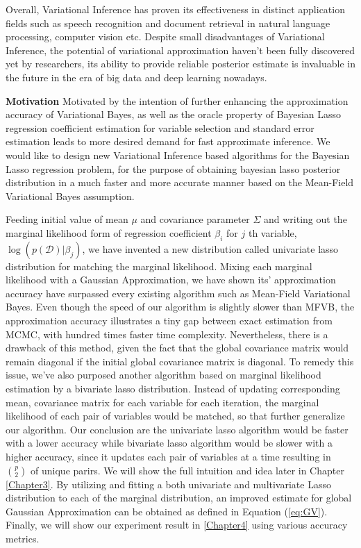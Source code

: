 Overall, Variational Inference has proven its effectiveness in distinct application fields such as speech recognition and document retrieval in natural language processing, computer vision etc. Despite small disadvantages of Variational Inference, the potential of variational approximation haven't been fully discovered yet by researchers, its ability to provide reliable posterior estimate is invaluable in the future in the era of big data and deep learning nowadays.

\textbf{Motivation}
Motivated by the intention of further enhancing the approximation accuracy of Variational Bayes, as well as the oracle property of Bayesian Lasso regression coefficient estimation for variable selection and standard error estimation leads to more desired demand for fast approximate inference. We would like to design new Variational Inference based algorithms for the Bayesian Lasso regression problem, for the purpose of obtaining bayesian lasso posterior distribution in a much faster and more accurate manner based on the Mean-Field Variational Bayes assumption.

Feeding initial value of mean $\mu$ and covariance parameter $\Sigma$ and writing out the marginal likelihood form of regression coefficient $\beta_i$ for $j$ th variable, $\log(p(\mathcal{D})|\beta_j)$, we have invented a new distribution called univariate lasso distribution for matching the marginal likelihood. Mixing each marginal likelihood with a Gaussian Approximation, we have shown its' approximation accuracy have surpassed every existing algorithm such as Mean-Field Variational Bayes. Even though the speed of our algorithm is slightly slower than MFVB, the approximation accuracy illustrates a tiny gap between exact estimation from MCMC, with hundred times faster time complexity.
Nevertheless, there is a drawback of this method, given the fact that the global covariance matrix would remain diagonal if the initial global covariance matrix is diagonal.
To remedy this issue, we've also purposed another algorithm based on marginal likelihood estimation by a bivariate lasso distribution. Instead of updating corresponding mean, covariance matrix for each variable for each iteration, the marginal likelihood of each pair of variables would be matched, so that further generalize our algorithm. Our conclusion are the univariate lasso algorithm would be faster with a lower accuracy while bivariate lasso algorithm would be slower with a higher accuracy, since it updates each pair of variables at a time resulting in ${p\choose 2}$ of unique parirs. We will show the full intuition and idea later in Chapter \ref{Chapter3}.
By utilizing and fitting a both univariate and multivariate Lasso distribution to each of the marginal distribution, an improved estimate for global Gaussian Approximation can be obtained as defined in Equation (\ref{eq:GV}). Finally, we will show our experiment result in \ref{Chapter4} using various accuracy metrics.


